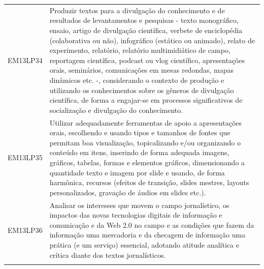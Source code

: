 \documentclass[12pt]{extarticle}
\begin{document}
\begin{longtable}{ll}
EM13LP34   & Produzir textos para a divulgação do conhecimento e de resultados de levantamentos e pesquisas - texto monográfico, ensaio, artigo de divulgação científica, verbete de enciclopédia (colaborativa ou não), infográfico (estático ou animado), relato de experimento, relatório, relatório multimidiático de campo, reportagem científica, podcast ou vlog científico, apresentações orais, seminários, comunicações em mesas redondas, mapas dinâmicos etc. -, considerando o contexto de produção e utilizando os conhecimentos sobre os gêneros de divulgação científica, de forma a engajar-se em processos significativos de socialização e divulgação do conhecimento.                                                                                                                                          \\
\rowcolor[HTML]{E0F7FA} 
EM13LP35   & Utilizar adequadamente ferramentas de apoio a apresentações orais, escolhendo e usando tipos e tamanhos de fontes que permitam boa visualização, topicalizando e/ou organizando o conteúdo em itens, inserindo de forma adequada imagens, gráficos, tabelas, formas e elementos gráficos, dimensionando a quantidade texto e imagem por slide e usando, de forma harmônica, recursos (efeitos de transição, slides mestres, layouts personalizados, gravação de áudios em slides etc.).                                                                                                                                                                                                                                                                                                                               \\
\rowcolor[HTML]{FFF} 
EM13LP36   & Analisar os interesses que movem o campo jornalístico, os impactos das novas tecnologias digitais de informação e comunicação e da Web 2.0 no campo e as condições que fazem da informação uma mercadoria e da checagem de informação uma prática (e um serviço) essencial, adotando atitude analítica e crítica diante dos textos jornalísticos.                                                                                                                                                                                                                                                                                                                                                                                                                                                                     \\
\rowcolor[HTML]{E0F7FA} 

\end{longtable}
\end{document}
